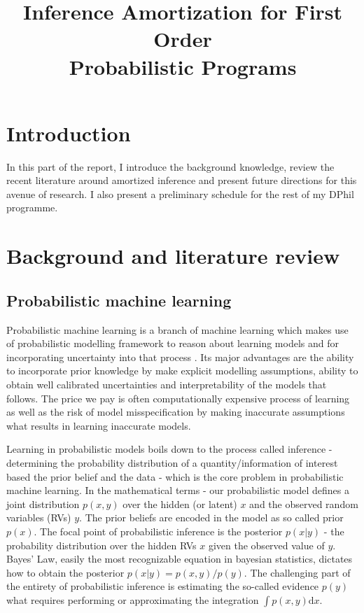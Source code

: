 \documentclass[12pt]{article}
\begin{document}




\title{Inference Amortization for First Order \\Probabilistic Programs}
\date{}
\maketitle

\vspace{-90pt}

\section{Introduction}

In this part of the report, I introduce the background knowledge, review the recent literature around amortized inference and present future directions for this avenue of research. 
I also present a preliminary schedule for the rest of my DPhil programme.

\section{Background and literature review}

\subsection{Probabilistic machine learning}
Probabilistic machine learning is a branch of machine learning which makes use of probabilistic modelling framework to reason about learning models and for incorporating uncertainty into that process \citep{Ghahramani2015}.
Its major advantages are the ability to incorporate prior knowledge by make explicit modelling assumptions, ability to obtain well calibrated uncertainties and interpretability of the models that follows.
The price we pay is often computationally expensive process of learning as well as the risk of model misspecification by making inaccurate assumptions what results in learning inaccurate models.

Learning in probabilistic models boils down to the process called inference - determining the probability distribution of a quantity/information of interest based the prior belief and the data - which is the core problem in probabilistic machine learning.
In the mathematical terms - our probabilistic model defines a joint distribution $p(x,y)$ over the hidden (or latent) $x$ and the observed random variables (RVs) $y$.
The prior beliefs are encoded in the model as so called prior $p(x)$.
The focal point of probabilistic inference is the posterior $p(x|y)$ - the probability distribution over the hidden RVs $x$ given the observed value of $y$.
Bayes' Law, easily the most recognizable equation in bayesian statistics, dictates how to obtain the posterior $p(x|y) = p(x,y)/p(y)$.
The challenging part of the entirety of probabilistic inference is estimating the so-called evidence $p(y)$ what requires performing or approximating the integration $\int p(x,y) \text{d}x$.
\end{document}
